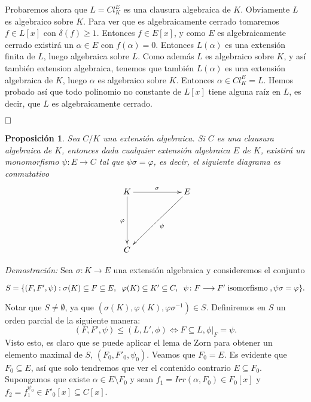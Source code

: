 \documentclass[12pt]{article}
\newtheorem{proposition}[theorem]{Proposición}
\begin{document}
Probaremos ahora que $L = Cl_{K}^{E}$ es una clausura algebraica de $K$. Obviamente $L$ es algebraico sobre $K$. Para ver que es algebraicamente cerrado tomaremos $f \in L[x]$ con $\delta (f) \geq 1$. Entonces $f \in E[x]$, y como $E$ es algebraicamente cerrado existirá un $\alpha \in E$ con $f(\alpha)=0$. Entonces $L(\alpha)$ es una extensión finita de $L$, luego algebraica sobre $L$. Como además $L$ es algebraico sobre $K$, y así también extension algebraica, tenemos que también $L(\alpha)$ es una extensión algebraica de $K$, luego $\alpha$ es algebraico sobre $K$. Entonces $\alpha \in Cl_{K}^{E} = L$. Hemos probado así que todo polinomio no constante de $L[x]$ tiene alguna raíz en $L$, es decir, que $L$ es algebraicamente cerrado.

$\hfill \square$

\begin{proposition} Sea $C/K$ una extensión algebraica. Si $C$ es una clausura algebraica de $K$, entonces dada cualquier extensión algebraica $E$ de $K$, existirá un monomorfismo $\psi \colon E \longrightarrow C$ tal que $\psi \sigma = \varphi$, es decir, el siguiente diagrama es conmutativo 
$$\xymatrix @=2cm {K \ar[r]^{\sigma} \ar[d]_{\varphi} & E\ar[ld]^\psi  \\ C   }$$
\end{proposition}
\emph{Demostración: }
Sea $\sigma \colon K \longrightarrow E$ una extensión algebraica y consideremos el conjunto \begin{center}$S = \lbrace (F, F', \psi): \sigma (K) \subseteq F \subseteq E,\hspace{0.2cm} \varphi(K) \subseteq K' \subseteq C, \hspace{0.2cm} \psi \colon F \longrightarrow F' \hspace{0.1cm} \text{isomorfismo} \hspace{0.1cm}, \psi \sigma = \varphi \rbrace .$\end{center}
Notar que $S \neq \emptyset$, ya que $(\sigma(K), \varphi(K), \varphi \sigma^{-1}) \in S$. Definiremos en $S$ un orden parcial de la siguiente manera: $$(F, F', \psi) \leq (L,L', \phi) \Longleftrightarrow F \subseteq L, \left.\phi \right|_F = \psi.$$ 
Visto esto, es claro que se puede aplicar el lema de Zorn para obtener un elemento maximal de $S$, $(F_{0},F'_{0}, \psi_{0})$. Veamos que $F_{0} = E$. Es evidente que $F_{0} \subseteq E$, así que solo tendremos que ver el contenido contrario $E \subseteq F_{0}$. Supongamos que existe $\alpha \in E \setminus F_{0}$ y sean $f_{1} = Irr(\alpha, F_{0}) \in F_{0}[x]$ y $f_{2} = f_{1}^{\psi_{0}} \in F'_{0}[x] \subseteq C[x]$.
\end{document}

